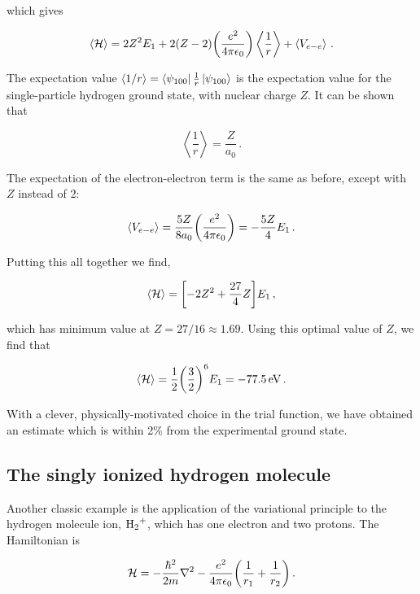 \documentclass[12pt, titlepage]{article}
\newcommand{\exv}[1]{\left\langle #1 \right\rangle}
\begin{document}
which gives

\begin{equation}
	\exv{\mathcal{H}} = 2Z^2E_1 + 2(Z-2)\qty(\frac{e^2}{4\pi\epsilon_0})\exv{\frac{1}{r}} + \exv{V_{e-e}} \,.
\end{equation}

The expectation value $\exv{1/r} = \bra{\psi_{100}}\frac{1}{r}\ket{\psi_{100}}$ is the expectation value for the single-particle hydrogen ground state, with nuclear charge $Z$. It can be shown that

\begin{equation}
	\exv{\frac{1}{r}} = \frac{Z}{a_0} \,.
\end{equation}

The expectation of the electron-electron term is the same as before, except with $Z$ instead of $2$:

\begin{equation}
	\exv{V_{e-e}} = \frac{5Z}{8a_0}\qty(\frac{e^2}{4\pi\epsilon_0}) = -\frac{5Z}{4}E_1\,.
\end{equation}

Putting this all together we find, 

\begin{equation}
	\exv{\mathcal{H}} = \qty[-2Z^2 + \frac{27}{4}Z] E_1 \,,
\end{equation}

which has minimum value at $Z = 27/16 \approx 1.69$. Using this optimal value of $Z$, we find that

\begin{equation*}
	\exv{\mathcal{H}} = \frac{1}{2}\qty(\frac{3}{2})^6 E_1 = -\SI{77.5}{\eV} \,.
\end{equation*}

With a clever, physically-motivated choice in the trial function, we have obtained an estimate which is within 2\% from the experimental ground state.

\subsection{The singly ionized hydrogen molecule}
Another classic example is the application of the variational principle to the hydrogen molecule ion, $\ce{H2+}$, which has one electron and two protons. The Hamiltonian is

\begin{equation}
	\mathcal{H} = -\frac{\hbar^2}{2m}\laplacian{} - \frac{e^2}{4\pi\epsilon_0}\qty(\frac{1}{r_1} + \frac{1}{r_2}) \,.
\end{equation}
\end{document}
